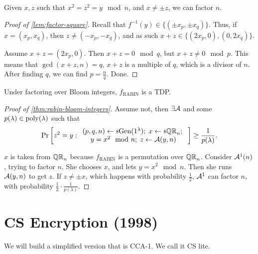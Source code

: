 \begin{lemma} \label{lem:factor-square}
	Given $x, z$ such that $x^2 = z^2 = y \mod n$, and $x \neq \pm z$, we can factor $n$.
\end{lemma}

\begin{proof}[Proof of \cref{lem:factor-square}]
	Recall that $f^{-1}(y) \in \{ (\pm x_p, \pm x_q) \}$.
	Thus, if $x = (x_p, x_q)$, then $z \neq (-x_p, -x_q)$, and as such $x+z \in \{ (2x_p, 0), (0, 2x_q)\}$.

	Assume $x+z = (2x_p, 0)$.
	Then $x+z = 0 \mod q$, but $x+z \neq 0 \mod p$.
	This means that $\gcd(x+z,n) = q$, \ie $x+z$ is a multiple of $q$, which is a divisor of $n$.
	After finding $q$, we can find $p = \frac{n}{q}$.
	Done.
\end{proof}

\begin{theorem} \label{thm:rabin-bloom-integers}
	Under factoring over Bloom integers, $f_{\mathrm{RABIN}}$ is a \ac{TDP}.
\end{theorem}

\begin{proof}[Proof of \cref{thm:rabin-bloom-integers}]
	Assume not, then $\exists \Adv$ and some $p(\lambda) \in \poly(\lambda)$ such that
	\begin{equation*}
		\Pr{
			z^2 = y :
			\begin{array}{c}
			(p, q, n) \rand{\Gen(1^{\lambda})}; \;
			x \rand{\QR[n]}; \; \\
			y = x^2 \mod n; \;
			z \from \Adv(y, n)
			\end{array}
		}
		\ge \frac{1}{p(\lambda)}.
	\end{equation*}

	$x$ is taken from $\QR[n]$ because $f_{\mathrm{RABIN}}$ is a permutation over $\QR[n]$.
	Consider $\Adv^1(n)$, trying to factor $n$.
	She chooses $x$, and lets $y = x^2 \mod n$.
	Then she runs $\Adv(y, n)$ to get $z$.
	If $z \neq \pm x$, which happens with probability $\frac{1}{2}$, $\Adv^1$ can factor $n$, with probability $\frac{1}{2} \cdot \frac{1}{p(\lambda)}$.
\end{proof}

\section{\acl{CS} Encryption (1998)}

We will build a simplified version that is \ac{CCA}-1.
We call it \ac{CS} lite.

